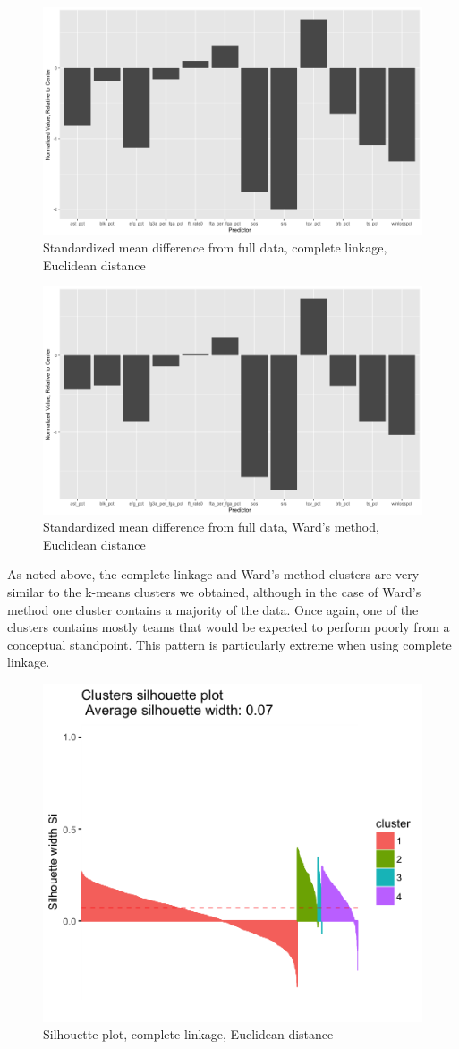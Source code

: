 \documentclass[10pt,a4paper, hidelinks]{article} %
\begin{document}
\begin{figure}[H]
	\centering
	\includegraphics[width=0.7\linewidth]{../fig/compweak}
		\caption{Standardized mean difference from full data, complete linkage, Euclidean distance}
\end{figure}

\begin{figure}[H]
	\centering
	\includegraphics[width=0.7\linewidth]{"../fig/wardweak"}
		\caption{Standardized mean difference from full data, Ward's method, Euclidean distance}
\end{figure}


As noted above, the complete linkage and Ward's method clusters are very similar to the k-means clusters we obtained, although in the case of Ward's method one cluster contains a majority of the data. Once again, one of the clusters contains mostly teams that would be expected to perform poorly from a conceptual standpoint. This pattern is particularly extreme when using complete linkage.

\begin{figure}[H]
	\centering
	\includegraphics[width=0.5\linewidth]{"../fig/compsil"}
		\caption{Silhouette plot, complete linkage, Euclidean distance}
\end{figure}
\end{document}
